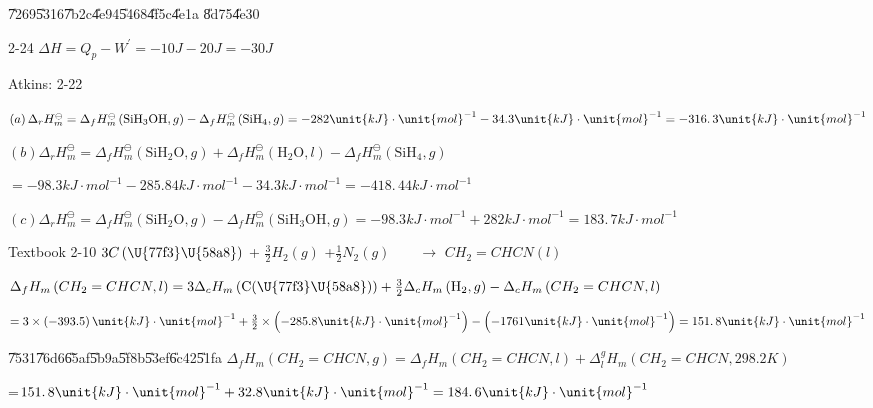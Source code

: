 \documentclass{article}
\begin{document}
\bigskip \U{7269}\U{5316}\U{7b2c}\U{4e94}\U{5468}\U{4f5c}\U{4e1a}\qquad 
\U{8d75}\U{4e30}

2-24 $\Delta H=Q_{p}-W^{\prime }=-10\unit{J}-20\unit{J}=-30\unit{J}$

Atkins: 2-22

$\left( a\right) \Delta _{r}H_{m}^{\ominus }=\Delta _{f}H_{m}^{\ominus
}\left( \text{SiH}_{3}\text{OH},g\right) -\Delta _{f}H_{m}^{\ominus }\left( 
\text{SiH}_{4},g\right) =-282\unit{kJ}\cdot \unit{mol}^{-1}-34.3\unit{kJ}%
\cdot \unit{mol}^{-1}=\allowbreak -316.\,\allowbreak 3\unit{kJ}\cdot \unit{%
mol}^{-1}$

$\left( b\right) \Delta _{r}H_{m}^{\ominus }=\Delta _{f}H_{m}^{\ominus
}\left( \text{SiH}_{2}\text{O},g\right) +\Delta _{f}H_{m}^{\ominus }\left( 
\text{H}_{2}\text{O},l\right) -\Delta _{f}H_{m}^{\ominus }\left( \text{SiH}%
_{4},g\right) $

$=-98.3\unit{kJ}\cdot \unit{mol}^{-1}-285.84\unit{kJ}\cdot \unit{mol}%
^{-1}-34.3\unit{kJ}\cdot \unit{mol}^{-1}=\allowbreak -418.\,\allowbreak 44%
\unit{kJ}\cdot \unit{mol}^{-1}$

$\left( c\right) \Delta _{r}H_{m}^{\ominus }=\Delta _{f}H_{m}^{\ominus
}\left( \text{SiH}_{2}\text{O},g\right) -\Delta _{f}H_{m}^{\ominus }\left( 
\text{SiH}_{3}\text{OH},g\right) =-98.3\unit{kJ}\cdot \unit{mol}^{-1}+282%
\unit{kJ}\cdot \unit{mol}^{-1}=\allowbreak 183.\,\allowbreak 7\unit{kJ}\cdot 
\unit{mol}^{-1}$

Textbook 2-10 $3C\left( \text{\U{77f3}\U{58a8}}\right) $ + $\frac{3}{2}%
H_{2}\left( g\right) $ +$\frac{1}{2}N_{2}\left( g\right) \qquad \rightarrow $
$CH_{2}=CHCN\left( l\right) \qquad $

$\Delta _{f}H_{m}\left( CH_{2}=CHCN,l\right) =3\Delta _{c}H_{m}\left( \text{%
C(\U{77f3}\U{58a8})}\right) +\frac{3}{2}\Delta _{c}H_{m}\left( \text{H}%
_{2},g\right) -\Delta _{c}H_{m}\left( CH_{2}=CHCN,l\right) $

$=3\times \left( -393.5\right) \unit{kJ}\cdot \unit{mol}^{-1}+\frac{3}{2}%
\times \left( -285.8\unit{kJ}\cdot \unit{mol}^{-1}\right) -\left( -1761\unit{%
kJ}\cdot \unit{mol}^{-1}\right) =\allowbreak 151.\,\allowbreak 8\unit{kJ}%
\cdot \unit{mol}^{-1}$

\bigskip \U{7531}\U{76d6}\U{65af}\U{5b9a}\U{5f8b}\U{53ef}\U{6c42}\U{51fa}%
\qquad $\Delta _{f}H_{m}\left( CH_{2}=CHCN,g\right) =\Delta _{f}H_{m}\left(
CH_{2}=CHCN,l\right) +\Delta _{l}^{g}H_{m}\left( CH_{2}=CHCN,298.2\unit{K}%
\right) $

=$151.\,\allowbreak 8\unit{kJ}\cdot \unit{mol}^{-1}+32.8\unit{kJ}\cdot \unit{%
mol}^{-1}=\allowbreak 184.\,\allowbreak 6\unit{kJ}\cdot \unit{mol}^{-1}$
\end{document}
